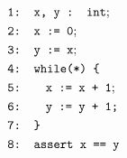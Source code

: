 \documentclass{article}
\begin{document}
	\begin{minipage}{.3\textwidth}
	\centering
	\begin{align*}
	&\texttt{1: x, y : int}; \\
	&\texttt{2: x := 0}; \\
	&\texttt{3: y := x}; \\
	&\texttt{4: while(*) \{} \\
	&\texttt{5:} \hspace*{2em} \texttt{x := x + 1}; \\
	&\texttt{6:} \hspace*{2em} \texttt{y := y + 1;} \\
	&\texttt{7: \}} \\
	& \texttt{8: assert x == y}
	\end{align*}
	
	
	
	\label{fig:square}
\end{minipage}%
\hfill
\end{document}

